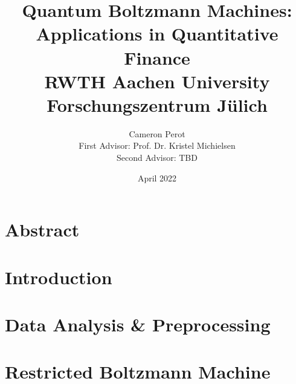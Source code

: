 \documentclass[12pt,twoside]{report}
\title{
    {Quantum Boltzmann Machines: Applications in Quantitative Finance}\\
    \vspace{0.5cm}
    {\large RWTH Aachen University}\\
    {\large Forschungszentrum J\"ulich}
}
\author{
    {Cameron Perot}\\
    {First Advisor: Prof. Dr. Kristel Michielsen}\\
    {Second Advisor: TBD}
}
\date{April 2022}
\begin{document}
\maketitle
{}

\clearpage\shipout\null
\chapter*{Abstract}
\clearpage\shipout\null

\tableofcontents
\clearpage\shipout\null

\chapter{Introduction}
\label{ch:introduction}


\chapter{Data Analysis \& Preprocessing}
\label{ch:data_analysis}


\chapter{Restricted Boltzmann Machine}
\label{ch:rbm}


\end{document}
